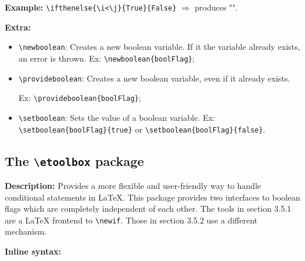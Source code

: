 \documentclass[12pt]{article}
\renewcommand{\i}{1}
\renewcommand{\j}{2}
\begin{document}
		\noindent\textbf{Example:} \verb|\ifthenelse{\i<\j}{True}{False}| $\Longrightarrow$ produces "\ifthenelse{\i<\j}{True}{False}".

		\noindent\textbf{Extra:}
		\begin{itemize}
			\item \verb|\newboolean|: Creates a new boolean variable. If it the variable already exists, an error is thrown. Ex: \verb|\newboolean{boolFlag}|;
			\item \verb|\provideboolean|: Creates a new boolean variable, even if it already exists. 
			
			Ex: \verb|\provideboolean{boolFlag}|;
			\item \verb|\setboolean|: Sets the value of a boolean variable. Ex: \verb|\setboolean{boolFlag}{true}| or \verb|\setboolean{boolFlag}{false}|.
		\end{itemize}

	\subsection{The \texttt{\textbackslash etoolbox} package}
	\noindent\textbf{Description:} Provides a more flexible and user-friendly way to handle conditional statements in \LaTeX. This package provides two interfaces to boolean flags which are completely independent of each other. The tools in section 3.5.1 are a LaTeX frontend to \verb|\newif|. Those in section 3.5.2 use a different mechanism.

	\noindent\textbf{Inline syntax:}
\end{document}
